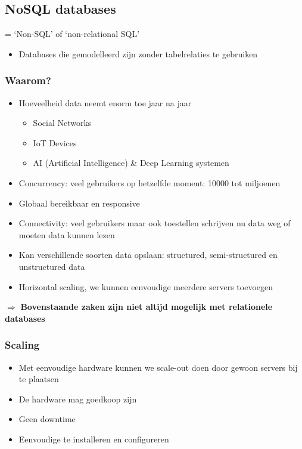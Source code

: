 \documentclass{article}
\newcommand{\bold}[1]{\textbf{#1}}
\begin{document}
\subsection{NoSQL databases}

= `Non-SQL' of `non-relational SQL'

\begin{itemize}
    \item Databases die gemodelleerd zijn zonder tabelrelaties te gebruiken
\end{itemize}

\subsubsection{Waarom?}

\begin{itemize}
    \item Hoeveelheid data neemt enorm toe jaar na jaar
    \begin{itemize}
        \item Social Networks
        \item IoT Devices
        \item AI (Artificial Intelligence) \& Deep Learning systemen
    \end{itemize}
    \item Concurrency: veel gebruikers op hetzelfde moment: 10000 tot miljoenen
    \item Globaal bereikbaar en responsive
    \item Connectivity: veel gebruikers maar ook toestellen schrijven nu data weg of moeten data kunnen lezen
    \item Kan verschillende soorten data opslaan: structured, semi-structured en unstructured data
    \item Horizontal scaling, we kunnen eenvoudige meerdere servers toevoegen
\end{itemize}

$\Rightarrow$ \bold{Bovenstaande zaken zijn niet altijd mogelijk met relationele databases}

\subsubsection{Scaling}

\begin{itemize}
    \item Met eenvoudige hardware kunnen we scale-out doen door gewoon servers bij te plaatsen
    \item De hardware mag goedkoop zijn
    \item Geen downtime
    \item Eenvoudige te installeren en configureren
\end{itemize}
\end{document}
